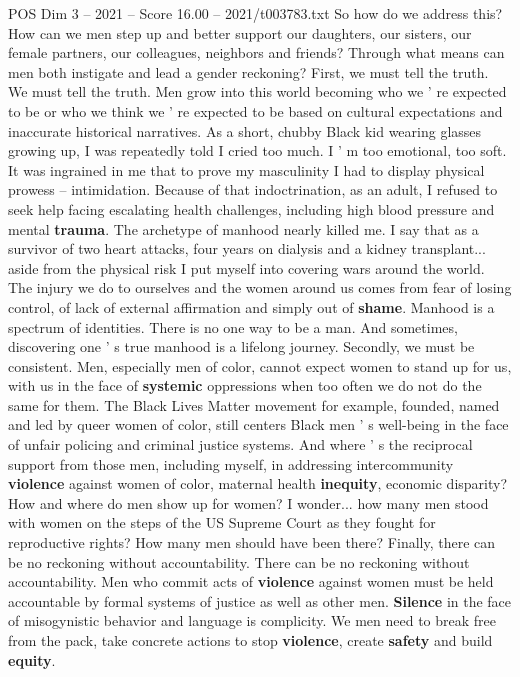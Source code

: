 \begin{textsample}{POS Dim 3 – 2021 – Score 16.00 – 2021/t003783.txt}
So how do we address this?
How can we men step up and better support our daughters, our sisters, our female partners, our colleagues, neighbors and friends?
Through what means can men both instigate and lead a gender reckoning?
First, we must tell the truth.
We must tell the truth.
Men grow into this world becoming who we ' re expected to be or who we think we ' re expected to be based on cultural expectations and inaccurate historical narratives.
As a short, chubby Black kid wearing glasses growing up, I was repeatedly told I cried too much.
I ' m too emotional, too soft.
It was ingrained in me that to prove my masculinity I had to display physical prowess -- intimidation.
Because of that indoctrination, as an adult, I refused to seek help facing escalating health challenges, including high blood pressure and mental \textbf{trauma}.
The archetype of manhood nearly killed me.
I say that as a survivor of two heart attacks, four years on dialysis and a kidney transplant... aside from the physical risk I put myself into covering wars around the world.
The injury we do to ourselves and the women around us comes from fear of losing control, of lack of external affirmation and simply out of \textbf{shame}.
Manhood is a spectrum of identities.
There is no one way to be a man.
And sometimes, discovering one ' s true manhood is a lifelong journey.
Secondly, we must be consistent.
Men, especially men of color, cannot expect women to stand up for us, with us in the face of \textbf{systemic} oppressions when too often we do not do the same for them.
The Black Lives Matter movement for example, founded, named and led by queer women of color, still centers Black men ' s well-being in the face of unfair policing and criminal justice systems.
And where ' s the reciprocal support from those men, including myself, in addressing intercommunity \textbf{violence} against women of color, maternal health \textbf{inequity}, economic disparity?
How and where do men show up for women?
I wonder... how many men stood with women on the steps of the US Supreme Court as they fought for reproductive rights?
How many men should have been there?
Finally, there can be no reckoning without accountability.
There can be no reckoning without accountability.
Men who commit acts of \textbf{violence} against women must be held accountable by formal systems of justice as well as other men. \textbf{Silence} in the face of misogynistic behavior and language is complicity.
We men need to break free from the pack, take concrete actions to stop \textbf{violence}, create \textbf{safety} and build \textbf{equity}.

\end{textsample}
